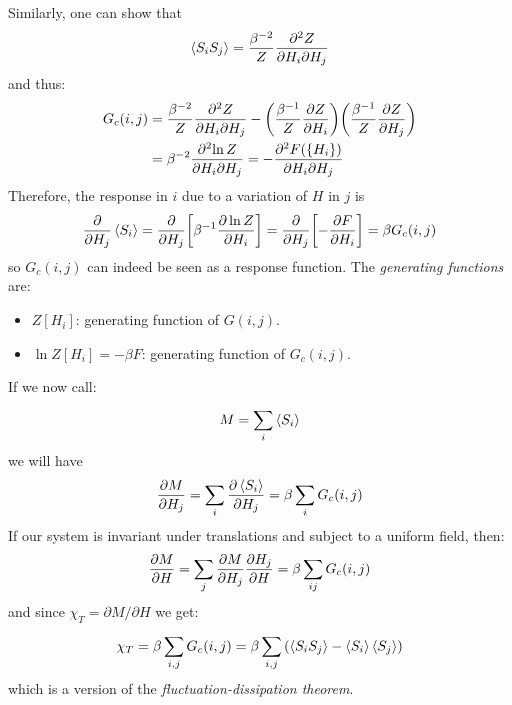 \documentclass[../main/main.tex]{subfiles}
\begin{document}
Similarly, one can show that
\begin{equation}
  \expval{S_i S_j} = \frac{\beta ^{-2}}{Z} \frac{\partial^2{Z} }{\partial{H_i} \partial{H_j}  }
\end{equation}
and thus:
\begin{equation}
\begin{split}
  G_c (i,j) & = \frac{\beta ^{-2}}{Z}  \frac{\partial^2{Z} }{\partial{H_i} \partial{H_j}  }
  - \qty(\frac{\beta ^{-1}}{Z} \pdv{Z}{H_i} ) \qty(\frac{\beta ^{-1}}{Z} \pdv{Z}{H_j} ) \\
  & = \beta ^{-2} \frac{\partial^2{\ln{Z} } }{\partial{H_i} \partial{H_j}  }
  = - \frac{\partial^2{F(\{ H_i \}  )} }{\partial{H_i} \partial{H_j}  }
\end{split}
\end{equation}
Therefore, the response in \( i \) due to a variation of \( H \) in \( j \) is
  \begin{equation*}
    \pdv{}{H_j} \expval{S_i} = \pdv{}{H_j} \qty[\beta ^{-1} \pdv{\ln{Z} }{H_i} ]  =\pdv{}{H_j} \qty[-\pdv{F}{H_i} ] =  \beta G_c (i,j)
  \end{equation*}
  so \( G_c (i,j) \) can indeed be seen as a response function.
The \emph{generating functions} are:
\begin{itemize}
\item \( Z[H_i] \): generating function of \( G(i,j) \).
\item \( \ln{Z[H_i]} = - \beta F  \): generating function of \( G_c (i,j) \).
\end{itemize}
 If we now call:
\begin{equation*}
  M = \sum_{i}^{}  \expval{S_i}
\end{equation*}
we will have
\begin{equation*}
  \pdv{M}{H_j} = \sum_{i}^{} \pdv{\expval{S_i} }{H_j} = \beta  \sum_{i}^{} G_c (i,j)
\end{equation*}
If our system is invariant under translations and subject to a uniform field, then:
\begin{equation*}
  \pdv{M}{H} = \sum_{j}^{} \pdv{M}{H_j} \pdv{H_j}{H}
  =  \beta \sum_{ij}^{} G_c (i,j)
\end{equation*}
and since  \( \chi _{T}=\partial M/\partial H \) we get:
\begin{equation}
  \chi _T = \beta \sum_{i,j}^{} G_c (i,j)
  = \beta \sum_{i,j}^{} \qty(  \expval{S_i S_j} - \expval{S_i} \expval{S_j}  )
\end{equation}
which is a version of the \emph{fluctuation-dissipation theorem}.
\end{document}

